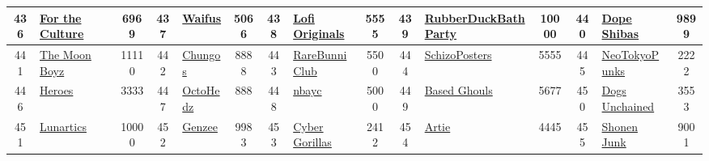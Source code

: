 \begin{table*}[]
{\begin{tabular}{|c|l|c|c|l|c|c|l|c|c|l|c|c|l|c|}
        436   & \href{https://www.nftftc.com/}{For the Culture}                                    & 6969              & 437   & \href{https://waifusion.io}{Waifus}                                                               & 5066              & 438   & \href{https://lofioriginals.com}{Lofi Originals}                                  & 5555              & 439   & \href{https://duck.art/}{RubberDuckBathParty}                                 & 10000             & 440   & \href{http://dopeshibas.fun}{Dope Shibas}                                                 & 9899                                    \\ \hline
        441   & \href{https://opensea.io/collection/the-moon-boyz}{The Moon Boyz}                  & 11110             & 442   & \href{http://chungos.xyz}{Chungos}                                                                & 8888              & 443   & \href{https://www.rarebunniclub.com}{RareBunniClub}                               & 5500              & 444   & \href{https://schizoposters.xyz/}{SchizoPosters}                              & 5555              & 445   & \href{https://www.neotokyopunks.com/}{NeoTokyoPunks}                                      & 2222                                    \\ \hline
        446   & \href{https://heroes.fun}{Heroes}                                                  & 3333              & 447   & \href{https://octohedz.com/}{OctoHedz}                                                            & 888               & 448   & \href{https://nbayc.co/}{nbayc}                                                   & 5000              & 449   & \href{http://basedghouls.com}{Based Ghouls}                                   & 5677              & 450   & \href{https://dogsunchainednft.com}{Dogs Unchained}                                       & 3553                                    \\ \hline
        451   & \href{https://thelunartics.com}{Lunartics}                                         & 10000             & 452   & \href{https://www.oddworx.com}{Genzee}                                                            & 9983              & 453   & \href{https://cybergorillas.io}{Cyber Gorillas}                                   & 2412              & 454   & \href{https://artie.com}{Artie}                                               & 4445              & 455   & \href{https://shonenjunk.xyz}{Shonen Junk}                                                & 9001                                    \\ \hline

\end{tabular}}
\end{table*}
